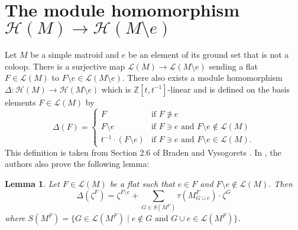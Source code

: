 \documentclass[10pt]{article}
\newcommand{\calL}{\mathcal{L}}
\newcommand{\calH}{\mathcal{H}}
\newtheorem{lemma}[theorem]{Lemma}
\theoremstyle{remark}
\begin{document}
\section{The module homomorphism $\calH(M) \to \calH(M\setminus e)$}
\label{sec:module_homomorphism}
Let $M$ be a simple matroid and $e$ be an element of its ground set that is not a coloop.
There is a surjective map $\calL(M) \to \calL(M\setminus e)$ sending a flat $F \in \calL(M)$ to $F\setminus e \in \calL(M\setminus e)$.
There also exists a module homomorphism $\Delta: \calH(M) \to \calH(M\setminus e)$ which
is $\mathbb{Z}[t, t^{-1}]$-linear and is defined on the basis elements $F \in \calL(M)$ by
\[
\Delta(F) = \begin{cases}
    F & \text{if }F\not\ni e\\
    F\setminus e & \text{if } F\ni e \text{ and }F\setminus e \notin \calL(M) \\
    t^{-1}\cdot (F\setminus e) & \text{if } F\ni e \text{ and }F\setminus e \in \calL(M).
\end{cases}
\]
This definition is taken from Section 2.6 of Braden and Vysogorets \cite{Bra19}.
In \cite{Bra19}, the authors also prove the following lemma:

\begin{lemma}
\label{lem:delta_zeta_nocoloop}
Let $F \in \calL(M)$ be a flat such that $e \in F$ and $F\setminus e \notin \calL(M)$. Then
\[\Delta(\zeta^F) = \zeta^{F\setminus e} + \sum_{G\in S(M^F)}\tau(M^F_{G\cup e})\cdot\zeta^G\]
where $S(M^F) = \{G\in \calL(M^F)\mid e\notin G \text{ and } G\cup e \in \calL(M^F)\}$.
\end{lemma}
\end{document}
